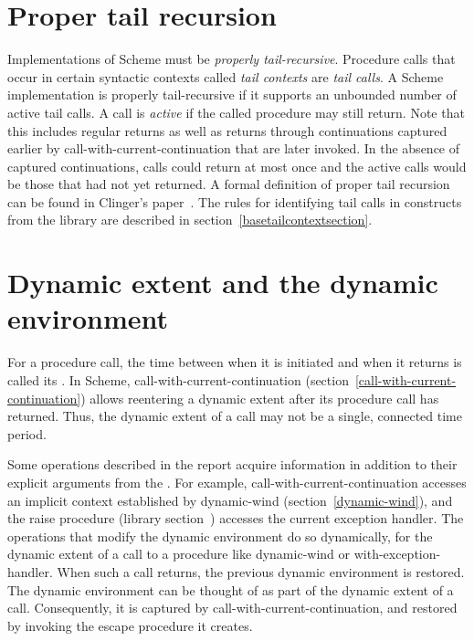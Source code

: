 \section{Proper tail recursion}
\label{proper tail recursion}

Implementations of Scheme must be
{\em properly tail-recursive}.
Procedure calls that occur in certain syntactic
contexts called \textit{tail contexts} 
are \textit{tail calls}.  A Scheme implementation is
properly tail-recursive if it supports an unbounded number of active
tail calls.  A call is {\em active} if the called procedure may still
return.  Note that this includes regular returns as well as returns
through continuations captured earlier by
{\cf call-with-current-continuation} that are later invoked.
In the absence of captured continuations, calls could
return at most once and the active calls would be those that had not
yet returned.
A formal definition of proper tail recursion can be found
in Clinger's paper~\cite{propertailrecursion}.  The rules for identifying tail calls
in constructs from the  library are described in
section~\ref{basetailcontextsection}.

\section{Dynamic extent and the dynamic environment}
\label{dynamicenvironmentsection}

For a procedure call, the time between when it is initiated and when
it returns is called its .  In Scheme, {\cf
  call-with-current-continuation}
(section~\ref{call-with-current-continuation}) allows reentering a
dynamic extent after its procedure call has returned.  Thus, the
dynamic extent of a call may not be a single, connected time period.

Some operations described in the report acquire information in
addition to their explicit arguments from the .  For example, {\cf call-\hp{}with-\hp{}current-\hp{}continuation}
accesses an implicit context established
by {\cf dynamic-wind} (section~\ref{dynamic-wind}), and the {\cf
  raise} procedure (library
section~) accesses the
current exception handler.  The operations that modify the dynamic
environment do so dynamically, for the dynamic extent of a call to a
procedure like {\cf dynamic-wind} or {\cf with-exception-handler}.
When such a call returns, the previous dynamic environment is
restored.  The dynamic environment can be thought of as part of the
dynamic extent of a call.  Consequently, it is captured by {\cf
  call-with-current-continuation}, and restored by invoking the escape
procedure it creates.

